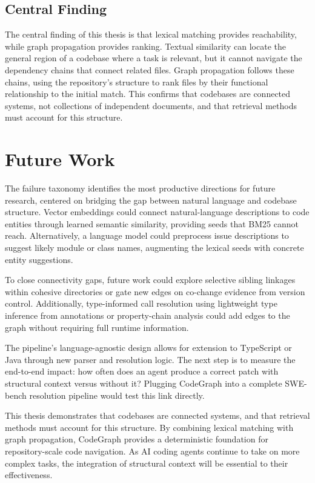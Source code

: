 \subsection{Central Finding}

The central finding of this thesis is that lexical matching provides reachability, while graph propagation provides ranking. Textual similarity can locate the general region of a codebase where a task is relevant, but it cannot navigate the dependency chains that connect related files. Graph propagation follows these chains, using the repository's structure to rank files by their functional relationship to the initial match. This confirms that codebases are connected systems, not collections of independent documents, and that retrieval methods must account for this structure.

\section{Future Work}
\label{sec:future-work}

The failure taxonomy identifies the most productive directions for future research, centered on bridging the gap between natural language and codebase structure. Vector embeddings could connect natural-language descriptions to code entities through learned semantic similarity, providing seeds that BM25 cannot reach. Alternatively, a language model could preprocess issue descriptions to suggest likely module or class names, augmenting the lexical seeds with concrete entity suggestions.

To close connectivity gaps, future work could explore selective sibling linkages within cohesive directories or gate new edges on co-change evidence from version control. Additionally, type-informed call resolution using lightweight type inference from annotations or property-chain analysis could add edges to the graph without requiring full runtime information.

The pipeline's language-agnostic design allows for extension to TypeScript or Java through new parser and resolution logic. The next step is to measure the end-to-end impact: how often does an agent produce a correct patch with structural context versus without it? Plugging CodeGraph into a complete SWE-bench resolution pipeline would test this link directly.

This thesis demonstrates that codebases are connected systems, and that retrieval methods must account for this structure. By combining lexical matching with graph propagation, CodeGraph provides a deterministic foundation for repository-scale code navigation. As AI coding agents continue to take on more complex tasks, the integration of structural context will be essential to their effectiveness.
